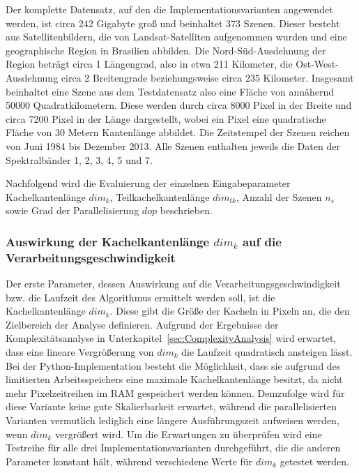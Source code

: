 Der komplette Datensatz, auf den die Implementationsvarianten angewendet werden, ist circa 242 Gigabyte groß und beinhaltet 373 Szenen. Dieser besteht aus Satellitenbildern, die von Landsat-Satelliten aufgenommen wurden und eine geographische Region in Brasilien abbilden. Die Nord-Süd-Ausdehnung der Region beträgt circa 1 Längengrad, also in etwa 211 Kilometer, die Ost-West-Ausdehnung circa 2 Breitengrade beziehungsweise circa 235 Kilometer. Insgesamt beinhaltet eine Szene aus dem Testdatensatz also eine Fläche von annähernd 50000 Quadratkilometern. Diese werden durch circa 8000 Pixel in der Breite und circa 7200 Pixel in der Länge dargestellt, wobei ein Pixel eine quadratische Fläche von 30 Metern Kantenlänge abbildet. Die Zeitstempel der Szenen reichen von Juni 1984 bis Dezember 2013. Alle Szenen enthalten jeweils die Daten der Spektralbänder 1, 2, 3, 4, 5 und 7.

Nachfolgend wird die Evaluierung der einzelnen Eingabeparameter Kachelkantenlänge $dim_k$, Teilkachelkantenlänge $dim_{tk}$, Anzahl der Szenen $n_s$ sowie Grad der Parallelisierung $dop$ beschrieben.

\subsubsection{Auswirkung der Kachelkantenlänge $dim_k$ auf die Verarbeitungsgeschwindigkeit}
Der erste Parameter, dessen Auswirkung auf die Verarbeitungsgeschwindigkeit bzw. die Laufzeit des Algorithmus ermittelt werden soll, ist die Kachelkantenlänge $dim_k$. Diese gibt die Größe der Kacheln in Pixeln an, die den Zielbereich der Analyse definieren. Aufgrund der Ergebnisse der Komplexitätsanalyse in Unterkapitel~\ref{sec:ComplexityAnalysis} wird erwartet, dass eine lineare Vergrößerung von $dim_k$ die Laufzeit quadratisch ansteigen lässt. Bei der Python-Implementation besteht die Möglichkeit, dass sie aufgrund des limitierten Arbeitsspeichers eine maximale Kachelkantenlänge besitzt, da nicht mehr Pixelzeitreihen im RAM gespeichert werden können. Demzufolge wird für diese Variante keine gute Skalierbarkeit erwartet, während die parallelisierten Varianten vermutlich lediglich eine längere Ausführungszeit aufweisen werden, wenn $dim_k$ vergrößert wird. Um die Erwartungen zu überprüfen wird eine Testreihe für alle drei Implementationsvarianten durchgeführt, die die anderen Parameter konstant hält, während verschiedene Werte für $dim_k$ getestet werden. 

